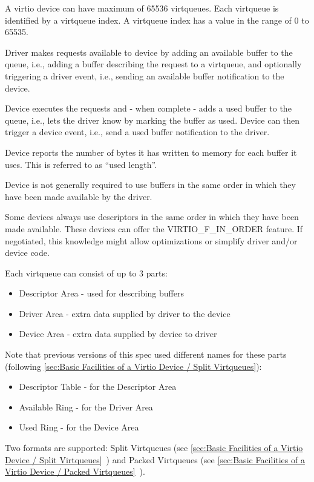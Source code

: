 A virtio device can have maximum of 65536 virtqueues. Each virtqueue is
identified by a virtqueue index. A virtqueue index has a value in the
range of 0 to 65535.

Driver makes requests available to device by adding
an available buffer to the queue, i.e., adding a buffer
describing the request to a virtqueue, and optionally triggering
a driver event, i.e., sending an available buffer notification
to the device.

Device executes the requests and - when complete - adds
a used buffer to the queue, i.e., lets the driver
know by marking the buffer as used. Device can then trigger
a device event, i.e., send a used buffer notification to the driver.

Device reports the number of bytes it has written to memory for
each buffer it uses. This is referred to as ``used length''.

Device is not generally required to use buffers in
the same order in which they have been made available
by the driver.

Some devices always use descriptors in the same order in which
they have been made available. These devices can offer the
VIRTIO_F_IN_ORDER feature. If negotiated, this knowledge
might allow optimizations or simplify driver and/or device code.

Each virtqueue can consist of up to 3 parts:
\begin{itemize}
\item Descriptor Area - used for describing buffers
\item Driver Area - extra data supplied by driver to the device
\item Device Area - extra data supplied by device to driver
\end{itemize}

\begin{note}
Note that previous versions of this spec used different names for
these parts (following \ref{sec:Basic Facilities of a Virtio Device / Split Virtqueues}):
\begin{itemize}
\item Descriptor Table - for the Descriptor Area
\item Available Ring - for the Driver Area
\item Used Ring - for the Device Area
\end{itemize}

\end{note}

Two formats are supported: Split Virtqueues (see \ref{sec:Basic
Facilities of a Virtio Device / Split
Virtqueues}~) and Packed Virtqueues (see \ref{sec:Basic
Facilities of a Virtio Device / Packed
Virtqueues}~).

